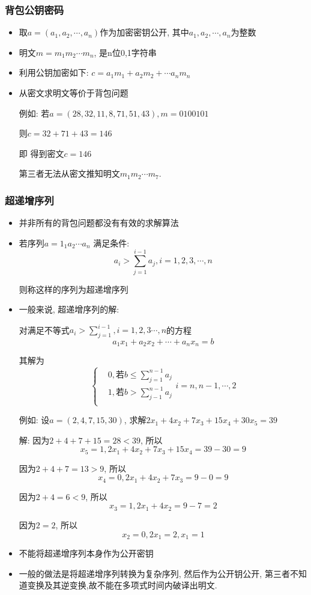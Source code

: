 \documentclass[UTF8]{ctexart}
\begin{document}
    \subsubsection{背包公钥密码}
    \begin{itemize}
        \item 取$a=(a_1, a_2, \cdots, a_n)$作为加密密钥公开, 其中$a_1, a_2, \cdots, a_n$为整数
        \item 明文$m=m_1m_2\cdots m_n$, 是n位0,1字符串
        \item 利用公钥加密如下: $c=a_1m_1+a_2m_2+\cdots a_nm_n$
        \item 从密文求明文等价于背包问题

        例如: 若$a=(28, 32, 11, 8, 71, 51, 43), m=0100101$

        则$c=32+71+43=146$

        即 得到密文$c=146$

        第三者无法从密文推知明文$m_1m_2\cdots m_7$.
    \end{itemize}

    \subsubsection{超递增序列}
    \begin{itemize}
        \item 并非所有的背包问题都没有有效的求解算法
        \item 若序列$a=1_1a_2\cdots a_n$ 满足条件:
        $$a_i > \sum\limits_{j=1}^{i-1}a_j, i=1,2,3,\cdots, n$$

        则称这样的序列为超递增序列

        \item 一般来说, 超递增序列的解:

        对满足不等式$a_i>\sum\limits_{j=1}^{i-1}, i=1,2,3\cdots, n$的方程
        $$a_1x_1+a_2x_2+\cdots +a_nx_n=b$$

        其解为
        $$
        \left\{ \begin{aligned}
            &0, \mbox{若}b\le \sum\limits_{j=1}^{n-1} a_j\\
            &1, \mbox{若}b>\sum\limits_{j-1}^{n-1} a_j\\
        \end{aligned}\right.
        i=n, n-1, \cdots, 2
        $$

        例如: 设$a=(2,4,7,15,30)$, 求解$2x_1+4x_2+7x_3+15x_4+30x_5=39$

        解: 因为$2+4+7+15=28<39$, 所以
        $$x_5=1, 2x_1+4x_2+7x_3+15x_4=39-30=9$$

        因为$2+4+7=13>9$, 所以
        $$x_4=0, 2x_1+4x_2+7x_3=9-0=9$$

        因为$2+4=6<9$, 所以
        $$x_3=1, 2x_1+4x_2=9-7=2$$

        因为$2=2$, 所以
        $$x_2=0, 2x_1=2, x_1=1$$

        \item 不能将超递增序列本身作为公开密钥
        \item 一般的做法是将超递增序列转换为复杂序列, 然后作为公开钥公开, 第三者不知道变换及其逆变换,故不能在多项式时间内破译出明文.
    \end{itemize}
\end{document}
